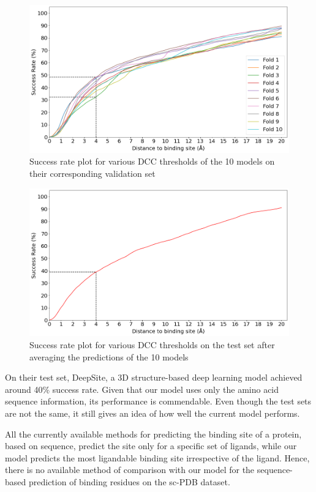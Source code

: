 \documentclass[journal=jcisd8,manuscript=article]{achemso}
\begin{document}
\begin{figure}
    \centering
    \noindent\includegraphics[scale=0.45]{valid_dcc.png}
    \caption{\centering Success rate plot for various DCC thresholds of the 10 models on their corresponding validation set}
    \label{fig:valid_dcc}
\end{figure}

\begin{figure}
    \centering
    \noindent\includegraphics[scale=0.45]{test_dcc.png}
    \caption{\centering Success rate plot for various DCC thresholds on the test set after averaging the predictions of the 10 models}
    \label{fig:test_dcc}
\end{figure}

On their test set, DeepSite, a 3D structure-based deep learning model \cite{jimenez2017deepsite} achieved around 40\% success rate. Given that our model uses only the amino acid sequence information, its performance is commendable. Even though the test sets are not the same, it still gives an idea of how well the current model performs.

All the currently available methods for predicting the binding site of a protein, based on sequence, predict the site only for a specific set of ligands, while our model predicts the most ligandable binding site irrespective of the ligand. Hence, there is no available method of comparison with our model for the sequence-based prediction of binding residues on the sc-PDB\cite{desaphy2015sc} dataset.
\end{document}
